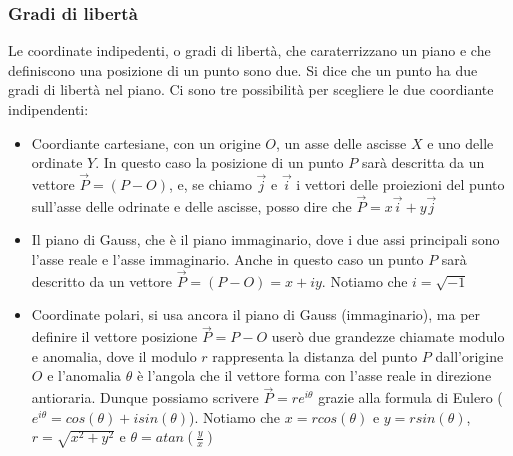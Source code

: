 \subsubsection{Gradi di libertà}
Le coordinate indipedenti, o gradi di libertà, che caraterrizzano un piano e che definiscono una posizione di un punto sono due. Si dice che un punto ha due gradi di libertà nel piano.\newline
Ci sono tre possibilità per scegliere le due coordiante indipendenti:
\begin{itemize}
    \item Coordiante cartesiane, con un origine $O$, un asse delle ascisse $X$ e uno delle ordinate $Y$. In questo caso la posizione di un punto $P$ sarà descritta da un vettore $\vec{P} = (P-O)$, e, se chiamo $\vec{j}$ e $\vec{i}$ i vettori delle proiezioni del punto sull'asse delle odrinate e delle ascisse, posso dire che $\vec{P} = x \vec{i} + y \vec{j}$
    \item Il piano di Gauss, che è il piano immaginario, dove i due assi principali sono l'asse reale e l'asse immaginario. Anche in questo caso un punto $P$ sarà descritto da un vettore $\vec{P} = (P - O) = x + iy$. Notiamo che $i = \sqrt{-1}$
    \item Coordinate polari, si usa ancora il piano di Gauss (immaginario), ma per definire il vettore posizione $\vec{P} = P - O$ userò due grandezze chiamate modulo e anomalia, dove il modulo $r$ rappresenta la distanza del punto $P$ dall'origine $O$ e l'anomalia $\theta$ è l'angola che il vettore forma con l'asse reale in direzione antioraria. Dunque possiamo scrivere $\vec{P} = r e^{i \theta}$ grazie alla formula di Eulero ($e^{i \theta} = cos(\theta)+  i sin(\theta)$). Notiamo che $x =r cos(\theta) $ e $y = r sin(\theta)$, $r = \sqrt{x^2 + y^2}$ e $\theta = atan\left( \frac{y}{x} \right)$
\end{itemize}
